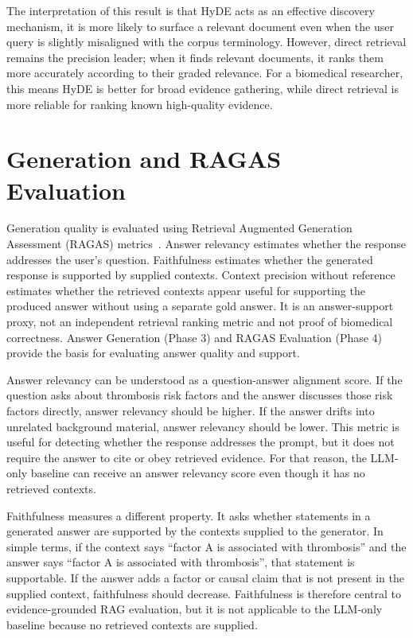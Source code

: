 The interpretation of this result is that HyDE acts as an effective discovery mechanism, it is more likely to surface a relevant document even when the user query is slightly misaligned with the corpus terminology. However, direct retrieval remains the precision leader; when it finds relevant documents, it ranks them more accurately according to their graded relevance. For a biomedical researcher, this means HyDE is better for broad evidence gathering, while direct retrieval is more reliable for ranking known high-quality evidence.

\section{Generation and RAGAS Evaluation}

Generation quality is evaluated using Retrieval Augmented Generation Assessment (RAGAS) metrics~\cite{es2024ragas}. Answer relevancy estimates whether the response addresses the user's question. Faithfulness estimates whether the generated response is supported by supplied contexts. Context precision without reference estimates whether the retrieved contexts appear useful for supporting the produced answer without using a separate gold answer. It is an answer-support proxy, not an independent retrieval ranking metric and not proof of biomedical correctness. Answer Generation (Phase 3) and RAGAS Evaluation (Phase 4) provide the basis for evaluating answer quality and support.

Answer relevancy can be understood as a question-answer alignment score. If the question asks about thrombosis risk factors and the answer discusses those risk factors directly, answer relevancy should be higher. If the answer drifts into unrelated background material, answer relevancy should be lower. This metric is useful for detecting whether the response addresses the prompt, but it does not require the answer to cite or obey retrieved evidence. For that reason, the LLM-only baseline can receive an answer relevancy score even though it has no retrieved contexts.

Faithfulness measures a different property. It asks whether statements in a generated answer are supported by the contexts supplied to the generator. In simple terms, if the context says ``factor A is associated with thrombosis'' and the answer says ``factor A is associated with thrombosis'', that statement is supportable. If the answer adds a factor or causal claim that is not present in the supplied context, faithfulness should decrease. Faithfulness is therefore central to evidence-grounded RAG evaluation, but it is not applicable to the LLM-only baseline because no retrieved contexts are supplied.

